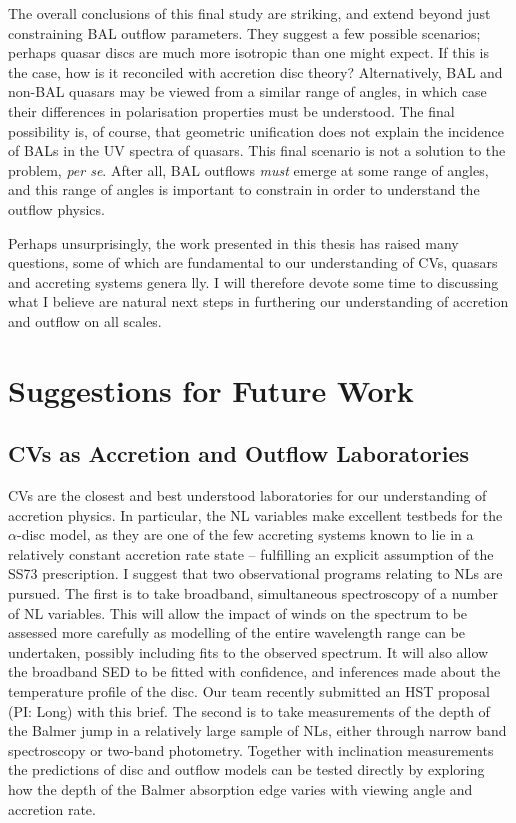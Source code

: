 The overall conclusions of this final study are striking, and extend 
beyond just constraining BAL outflow parameters. 
They suggest a few possible scenarios; perhaps quasar discs are much
more isotropic than one might expect. If this is the case, how is it
reconciled with accretion disc theory? Alternatively, BAL and
non-BAL quasars may be viewed from a similar range of angles, in 
which case their differences in polarisation properties must be 
understood. The final possibility is, of course, that geometric unification
does not explain the incidence of BALs in the UV spectra of quasars.
This final scenario is not a solution to the problem, {\sl per se}. After all, BAL
outflows {\em must} emerge at some range of angles, and this range of 
angles is important to constrain in order to understand the outflow physics.

Perhaps unsurprisingly, the work presented in this thesis has raised 
many questions, some of which are fundamental to our understanding of CVs, 
quasars and accreting systems genera lly. I
will therefore devote some time to discussing what I believe are 
natural next steps in furthering our understanding of accretion
and outflow on all scales.

\section{Suggestions for Future Work}

\subsection{CVs as Accretion and Outflow Laboratories}

CVs are the closest and best understood laboratories for
our understanding of accretion physics. In particular, the NL
variables make excellent testbeds for the $\alpha$-disc model,
as they are one of the few accreting systems known to
lie in a relatively constant accretion rate state -- fulfilling 
an explicit assumption of the SS73 prescription. I suggest
that two observational programs relating to NLs are pursued.
The first is to take broadband, simultaneous spectroscopy of a number
of NL variables. This will allow the impact of winds on the spectrum
to be assessed more carefully as modelling of the entire wavelength
range can be undertaken, possibly including fits to the observed spectrum.
It will also allow the broadband SED to be fitted with confidence,
and inferences made about the temperature profile of the disc. 
Our team recently submitted an HST proposal (PI: Long) with this brief.
The second is to take measurements of the depth of the Balmer jump
in a relatively large sample of NLs, either through narrow band spectroscopy
or two-band photometry. Together with inclination measurements the predictions
of disc and outflow models can be tested directly by exploring how the depth
of the Balmer absorption edge varies with viewing angle and accretion rate.

